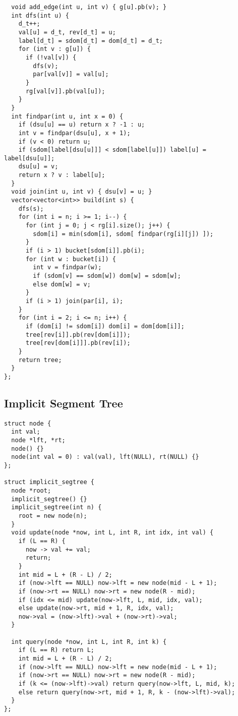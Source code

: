 \documentclass[FSZ,a4paper,onesided]{article}
\begin{document}
\begin{multicols*}{\COLS}
\begin{lstlisting}
  void add_edge(int u, int v) { g[u].pb(v); }
  int dfs(int u) {
    d_t++;
    val[u] = d_t, rev[d_t] = u;
    label[d_t] = sdom[d_t] = dom[d_t] = d_t;
    for (int v : g[u]) {
      if (!val[v]) {
        dfs(v);
        par[val[v]] = val[u];
      }
      rg[val[v]].pb(val[u]);
    }
  }
  int findpar(int u, int x = 0) {
    if (dsu[u] == u) return x ? -1 : u;
    int v = findpar(dsu[u], x + 1);
    if (v < 0) return u;
    if (sdom[label[dsu[u]]] < sdom[label[u]]) label[u] = label[dsu[u]];
    dsu[u] = v;
    return x ? v : label[u];
  }
  void join(int u, int v) { dsu[v] = u; }
  vector<vector<int>> build(int s) {
    dfs(s);
    for (int i = n; i >= 1; i--) {
      for (int j = 0; j < rg[i].size(); j++) {
        sdom[i] = min(sdom[i], sdom[ findpar(rg[i][j]) ]);
      }
      if (i > 1) bucket[sdom[i]].pb(i);
      for (int w : bucket[i]) {
        int v = findpar(w);
        if (sdom[v] == sdom[w]) dom[w] = sdom[w];
        else dom[w] = v;
      }
      if (i > 1) join(par[i], i);
    }
    for (int i = 2; i <= n; i++) {
      if (dom[i] != sdom[i]) dom[i] = dom[dom[i]];
      tree[rev[i]].pb(rev[dom[i]]);
      tree[rev[dom[i]]].pb(rev[i]);
    }
    return tree;
  }
};
\end{lstlisting}
\subsection{Implicit Segment Tree}
\begin{lstlisting}
struct node {
  int val;
  node *lft, *rt;
  node() {}
  node(int val = 0) : val(val), lft(NULL), rt(NULL) {}
};

struct implicit_segtree {
  node *root;
  implicit_segtree() {}
  implicit_segtree(int n) {
    root = new node(n);
  }
  void update(node *now, int L, int R, int idx, int val) {
    if (L == R) {
      now -> val += val;
      return;
    }
    int mid = L + (R - L) / 2;
    if (now->lft == NULL) now->lft = new node(mid - L + 1);
    if (now->rt == NULL) now->rt = new node(R - mid);
    if (idx <= mid) update(now->lft, L, mid, idx, val);
    else update(now->rt, mid + 1, R, idx, val);
    now->val = (now->lft)->val + (now->rt)->val;
  }

  int query(node *now, int L, int R, int k) {
    if (L == R) return L;
    int mid = L + (R - L) / 2;
    if (now->lft == NULL) now->lft = new node(mid - L + 1);
    if (now->rt == NULL) now->rt = new node(R - mid);
    if (k <= (now->lft)->val) return query(now->lft, L, mid, k);
    else return query(now->rt, mid + 1, R, k - (now->lft)->val);
  }
};
\end{lstlisting}

\end{multicols*}
\end{document}

